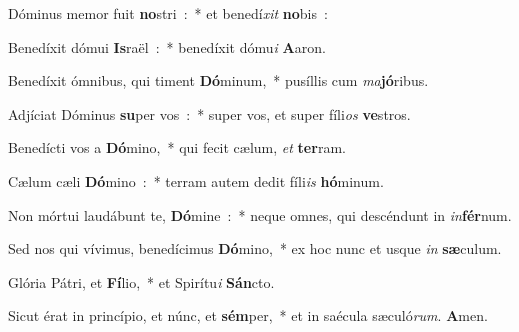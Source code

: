 \item Dóminus memor fuit \textbf{no}\-stri~:~* et benedí\emph{xit} \textbf{no}\-bis~:
\item Benedíxit dómui \textbf{Is}\-raël~:~* benedíxit dómu\emph{i} \textbf{A}\-aron.
\item Benedíxit ómnibus, qui timent \textbf{Dó}\-minum,~* pusíllis cum \emph{ma}\-\textbf{jó}\-ribus.
\item Adjíciat Dóminus \textbf{su}\-per vos~:~* super vos, et super fíli\emph{os} \textbf{ve}\-stros.
\item Benedícti vos a \textbf{Dó}\-mino,~* qui fecit cælum, \emph{et} \textbf{ter}\-ram.
\item Cælum cæli \textbf{Dó}\-mino~:~* terram autem dedit fíli\emph{is} \textbf{hó}\-mi\-num.
\item Non mórtui laudábunt te, \textbf{Dó}\-mine~:~* neque omnes, qui descéndunt in \emph{in}\-\textbf{fér}\-num.
\item Sed nos qui vívimus, benedícimus \textbf{Dó}\-mino,~* ex hoc nunc et usque \emph{in} \textbf{sæ}\-culum.
\item Glória Pátri, et \textbf{Fí}\-lio,~* et Spirítu\emph{i} \textbf{Sán}\-cto.
\item Sicut érat in princípio, et núnc, et \textbf{sém}\-per,~* et in saécula sæculó\emph{rum}. \textbf{A}\-men.